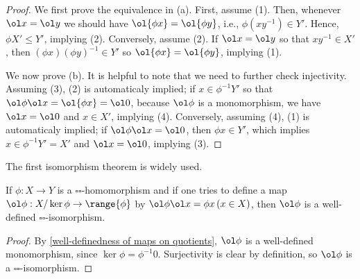 \begin{proof}
    We first prove the equivalence in (a).
    First, assume (1).
    Then, whenever $\ol x=\ol y$ we should have $\ol{\phi x}=\ol{\phi y}$, i.e., $\phi(xy^{-1})\in Y'$.
    Hence, $\phi X'\leq Y'$, implying (2).
    Conversely, assume (2).
    If $\ol x=\ol y$ so that $xy^{-1}\in X'$, then $(\phi x)(\phi y)^{-1}\in Y'$ so $\ol{\phi x}=\ol{\phi y}$, implying (1).

    We now prove (b).
    It is helpful to note that we need to further check injectivity.
    Assuming (3), (2) is automaticaly implied; if $x\in\phi^{-1}Y'$ so that $\ol\phi\ol x=\ol{\phi x}=\ol 0$, because $\ol\phi$ is a monomorphism, we have $\ol x=\ol 0$ and $x\in X'$, implying (4).
    Conversely, assuming (4), (1) is automaticaly implied; if $\ol\phi\ol x=\ol 0$, then $\phi x\in Y'$, which implies $x\in\phi^{-1} Y'=X'$ and $\ol x=\ol 0$, implying (3).
\end{proof}

The first isomorphism theorem is widely used.
\begin{thm}
    If $\phi: X\rightarrow Y$ is a $\square\square$-homomorphism and if one tries to define a map $\ol\phi: X/\ker\phi\rightarrow\range{\phi}$ by $\ol\phi\ol x=\phi x\,(x\in X)$, then $\ol\phi$ is a well-defined $\square\square$-isomorphism.
\end{thm}
\begin{proof}
    By \cref{well-definedness of maps on quotients}, $\ol\phi$ is a well-defined monomorphism, since $\ker\phi=\phi^{-1}0$.
    Surjectivity is clear by definition, so $\ol\phi$ is a $\square\square$-isomorphism.
\end{proof}

